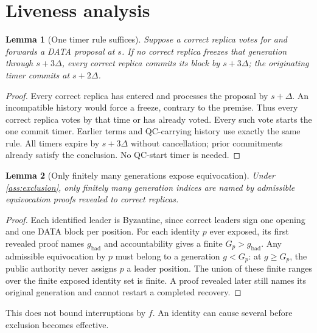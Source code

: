 \documentclass[11pt,a4paper]{article}
\newcommand{\NEW}[1]{{\color{diffNew}#1}}
\newcommand{\NEW}[1]{#1}
\newtheorem{lemma}[lemma]{Lemma}
\begin{document}
\section{Liveness analysis}
\label{sec:liveness}
\begin{lemma}[One timer rule suffices]
\label{lem:window}
Suppose a correct replica votes for and forwards a DATA proposal at $s$.
If no correct replica freezes that generation through $s+3\Delta$, every
correct replica commits its block by $s+3\Delta$; the originating timer
commits at $s+2\Delta$.
\end{lemma}
\begin{proof}
Every correct replica has entered and processes the proposal by $s+\Delta$.
An incompatible history would force a freeze, contrary to the premise.
Thus every correct replica votes by that time or has already voted.
Every such vote starts the one \NEW{commit} timer. Earlier terms and
QC-carrying history use exactly the same rule. All timers expire by
$s+3\Delta$ without cancellation; prior commitments already satisfy
the conclusion. No QC-start timer is needed.
\end{proof}

\begin{lemma}[Only finitely many generations expose equivocation]
\label{lem:finite}
Under \cref{ass:exclusion}, only finitely many generation indices are
named by admissible equivocation proofs revealed to correct replicas.
\end{lemma}
\begin{proof}
Each identified leader is Byzantine, since correct leaders sign one
opening and one DATA block per position. For each identity $p$ ever exposed,
its first revealed proof names $g_{\mathrm{bad}}$ and accountability gives
a finite $G_p>g_{\mathrm{bad}}$. Any admissible equivocation by $p$ must
belong to a generation $g<G_p$: at $g\ge G_p$, the public authority
never assigns $p$ a leader position. The union of these finite ranges
over the finite exposed identity set is finite. A proof revealed later
still names its original generation and cannot restart a completed recovery.
\end{proof}
This does not bound interruptions by $f$. An identity can cause several
before exclusion becomes effective.
\end{document}
